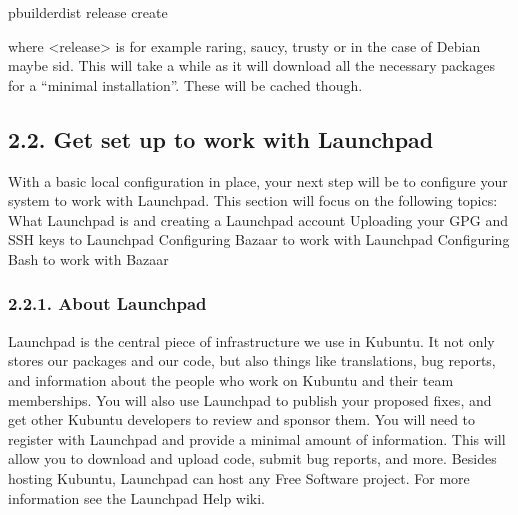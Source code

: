 \documentclass[letterpaper,10pt,english]{sphinxmanual}
\begin{document}
\begin{sphinxVerbatim}[commandchars=\\\{\}]
\PYGZdl{} pbuilder\PYGZhy{}dist \PYGZlt{}release\PYGZgt{} create
\end{sphinxVerbatim}

\sphinxAtStartPar
where \textless{}release\textgreater{} is for example raring, saucy, trusty or in the case of Debian maybe sid. This will take a while as it will download all the necessary packages for a “minimal installation”. These will be cached though.


\subsection{2.2. Get set up to work with Launchpad}
\label{\detokenize{docs/packaging-guide/getting-started:get-set-up-to-work-with-launchpad}}
\sphinxAtStartPar
With a basic local configuration in place, your next step will be to configure your system to work with Launchpad. This section will focus on the following topics:
What Launchpad is and creating a Launchpad account
Uploading your GPG and SSH keys to Launchpad
Configuring Bazaar to work with Launchpad
Configuring Bash to work with Bazaar


\subsubsection{2.2.1. About Launchpad}
\label{\detokenize{docs/packaging-guide/getting-started:about-launchpad}}
\sphinxAtStartPar
Launchpad is the central piece of infrastructure we use in Kubuntu. It not only stores our packages and our code, but also things like translations, bug reports, and information about the people who work on Kubuntu and their team memberships. You will also use Launchpad to publish your proposed fixes, and get other Kubuntu developers to review and sponsor them.
You will need to register with Launchpad and provide a minimal amount of information. This will allow you to download and upload code, submit bug reports, and more.
Besides hosting Kubuntu, Launchpad can host any Free Software project. For more information see the Launchpad Help wiki.
\end{document}
